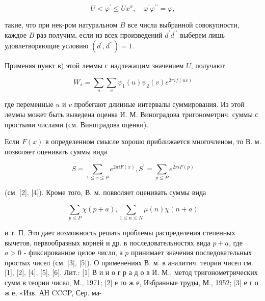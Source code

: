 \documentclass[10pt]{article}
\begin{document}
\[

U<\varphi^{\prime} \leqslant U x^{\sigma}, \quad \varphi^{\prime} \varphi^{\prime \prime}=\varphi,

\]



такие, что при нек-ром натуральном $B$ все числа выбранной совокупности, каждое $B$ раз получим, если из всех произведений $d^{\prime} d^{\prime \prime}$ выберем лишь удовлетворяющие условию $\left(d^{\prime}, d^{\prime \prime}\right)=1$.



Применяя пункт в) этой леммы с надлежащим значением $U$, получают



\[

W_{s}=\sum_{u} \sum_{v} \psi_{1}(u) \psi_{2}(v) e^{2 \pi i f(u v)}

\]



где переменные $u$ и $v$ пробегают длинные интервалы суммирования. Из этой леммы может быть выведена оценка И. М. Виноградова тригонометрич. суммы с простыми числами (см. Виноградова оценки).



Если $F(x)$ в определенном смысле хорошо приближается многочленом, то В. м. позволяет оценивать суммы вида



\[

S=\sum_{1 \leqslant x \leqslant P} e^{2 \pi i F(x)}, S^{\prime}=\sum_{p \leqslant P} e^{2 \pi i F(p)}

\]



(см. [2], [4]). Кроме того, В. м. повволяет оценивать суммы вида



\[

\sum_{p \leqslant P} \chi(p+a), \sum_{1 \leqslant n \leqslant N} \mu(n) \chi(n+a)

\]



и т. П. Это дает возможность решать проблемы распределения степенных вычетов, первообразных корней и др. в последовательностях вида $p+a$, где $a>0$ - фиксированное целое число, а $p$ принимает значения последовательных простых чисел (см. [3], [5]). О применениях В. м. в аналитич. теории чисел см. [1], [2], [4], [5], [6]. Лит.: [1] В и н о г р а д о в И. М., метод тригонометрических сумм в теории чисел, М., 1971; [2] е го ж е, Избранные труды, М., 1952; [3] е г о ж е, «Изв. АН CCCP, Сер. ма-
\end{document}
